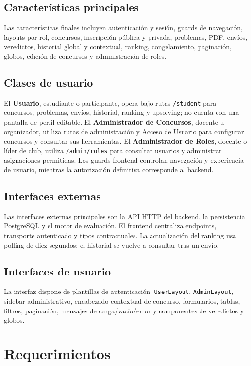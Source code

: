 \documentclass[11pt,a4paper]{article}
\begin{document}
\subsection{Características principales}
Las características finales incluyen autenticación y sesión, guards de navegación, layouts por rol, concursos, inscripción pública y privada, problemas, PDF, envíos, veredictos, historial global y contextual, ranking, congelamiento, paginación, globos, edición de concursos y administración de roles.

\subsection{Clases de usuario}
El \textbf{Usuario}, estudiante o participante, opera bajo rutas \texttt{/student} para concursos, problemas, envíos, historial, ranking y upsolving; no cuenta con una pantalla de perfil editable. El \textbf{Administrador de Concursos}, docente u organizador, utiliza rutas de administración y Acceso de Usuario para configurar concursos y consultar sus herramientas. El \textbf{Administrador de Roles}, docente o líder de club, utiliza \texttt{/admin/roles} para consultar usuarios y administrar asignaciones permitidas. Los guards frontend controlan navegación y experiencia de usuario, mientras la autorización definitiva corresponde al backend.

\subsection{Interfaces externas}
Las interfaces externas principales son la API HTTP del backend, la persistencia PostgreSQL y el motor de evaluación. El frontend centraliza endpoints, transporte autenticado y tipos contractuales. La actualización del ranking usa polling de diez segundos; el historial se vuelve a consultar tras un envío.

\subsection{Interfaces de usuario}
La interfaz dispone de plantillas de autenticación, \texttt{UserLayout}, \texttt{AdminLayout}, sidebar administrativo, encabezado contextual de concurso, formularios, tablas, filtros, paginación, mensajes de carga/vacío/error y componentes de veredictos y globos.

\section{Requerimientos}
\label{sec:requerimientos}
\end{document}
